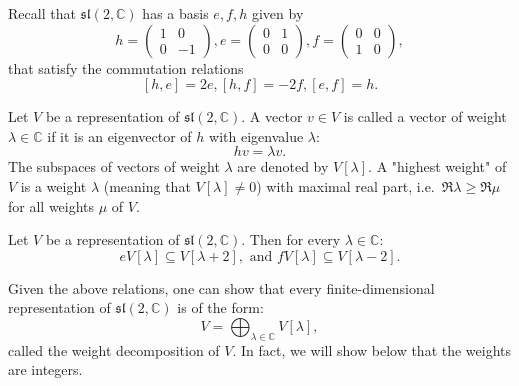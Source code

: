 \documentclass{report}
\begin{document}
Recall that $\mathfrak{sl}(2, \mathbb C)$ has a basis $e, f, h$ given by
\[
h = \begin{pmatrix}
    1 & 0 \\
    0 & -1
\end{pmatrix},    
e = \begin{pmatrix}
    0 & 1 \\
    0 & 0
\end{pmatrix},
f = \begin{pmatrix}
    0 & 0 \\
    1 & 0
\end{pmatrix},
\]
that satisfy the commutation relations
\[
[h, e] = 2e, [h, f] = -2f, [e, f] = h.
\]

\begin{definition}
    Let $V$ be a representation of $\mathfrak{sl}(2, \mathbb C)$.
    A vector $v \in V$ is called a vector of weight $\lambda \in \mathbb C$ if it is an eigenvector of $h$ with eigenvalue $\lambda$:
    \[
    h v = \lambda v.
    \]
    The subspaces of vectors of weight $\lambda$ are denoted by $V[\lambda]$.
    A "highest weight" of $V$ is a weight $\lambda$ (meaning that $V[\lambda] \neq 0$) with maximal real part, i.e.\ $\Re \lambda \geq \Re \mu$ for all weights $\mu$ of $V$.
\end{definition}
\begin{lemma}
    Let $V$ be a representation of $\mathfrak{sl}(2, \mathbb C)$.
    Then for every $\lambda \in \mathbb C$:
    \[
    e V[\lambda] \subseteq V[\lambda + 2], \text{ and } f V[\lambda] \subseteq V[\lambda - 2].
    \]
\end{lemma}

Given the above relations, one can show that every finite-dimensional representation of $\mathfrak{sl}(2, \mathbb C)$ is of the form:
\[
V = \bigoplus_{\lambda \in \mathbb C} V[\lambda],
\]
called the weight decomposition of $V$.
In fact, we will show below that the weights are integers.
\end{document}

